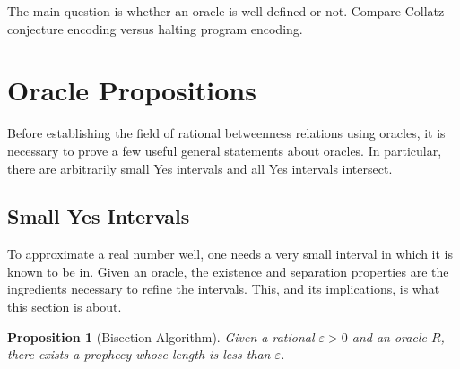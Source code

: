 \documentclass[12pt]{article}
\newtheorem{proposition}{Proposition}[section]
\begin{document}
The main question is whether an oracle is well-defined or not. Compare Collatz conjecture encoding versus halting program encoding. 

\section{Oracle Propositions}

Before establishing the field of rational betweenness relations using oracles, it is necessary to prove a few useful general statements about oracles. In particular, there are arbitrarily small Yes intervals and all Yes intervals intersect. 

\subsection{Small Yes Intervals}

To approximate a real number well, one needs a very small interval in which it is known to be in. Given an oracle, the existence and separation properties are the ingredients necessary to refine the intervals. This, and its implications, is what this section is about. 


\begin{proposition}[Bisection Algorithm]
    Given a rational $\varepsilon >0$ and an oracle $R$, there exists a prophecy whose length is less than $\varepsilon$.
\end{proposition}
\end{document}
